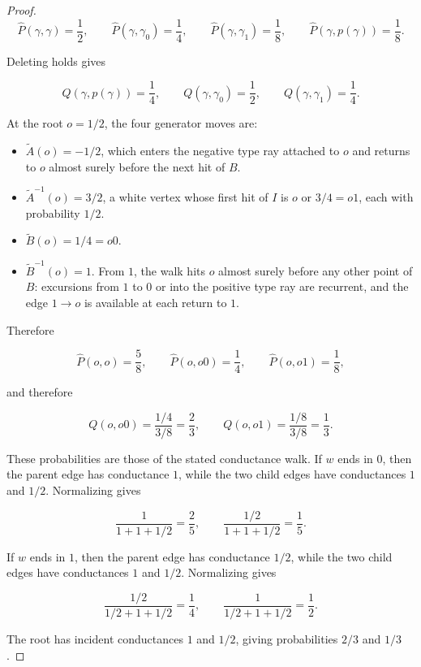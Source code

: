 \documentclass[11pt,a4paper]{scrartcl}
\begin{document}
\begin{proof}
\[
\widehat P(\gamma,\gamma)=\frac12,
\qquad
\widehat P(\gamma,\gamma_0)=\frac14,
\qquad
\widehat P(\gamma,\gamma_1)=\frac18,
\qquad
\widehat P(\gamma,p(\gamma))=\frac18 .
\]

Deleting holds gives

\[
Q(\gamma,p(\gamma))=\frac14,
\qquad
Q(\gamma,\gamma_0)=\frac12,
\qquad
Q(\gamma,\gamma_1)=\frac14 .
\]

At the root \(o=1/2\), the four generator moves are:

\begin{itemize}[leftmargin=*]
\item \(\widetilde A(o)=-1/2\), which enters the negative type ray attached to
  \(o\) and returns to \(o\) almost surely before the next hit of \(B\).
\item \(\widetilde A^{-1}(o)=3/2\), a white vertex whose first hit of \(I\) is
  \(o\) or \(3/4=o1\), each with probability \(1/2\).
\item \(\widetilde B(o)=1/4=o0\).
\item \(\widetilde B^{-1}(o)=1\). From \(1\), the walk hits \(o\) almost surely
  before any other point of \(B\): excursions from \(1\) to \(0\) or into the
  positive type ray are recurrent, and the edge \(1\to o\) is available at
  each return to \(1\).
\end{itemize}

Therefore

\[
\widehat P(o,o)=\frac58,
\qquad
\widehat P(o,o0)=\frac14,
\qquad
\widehat P(o,o1)=\frac18,
\]

and therefore

\[
Q(o,o0)=\frac{1/4}{3/8}=\frac23,
\qquad
Q(o,o1)=\frac{1/8}{3/8}=\frac13 .
\]

These probabilities are those of the stated conductance walk. If
\(w\) ends in \(0\), then the parent edge has conductance \(1\), while the two
child edges have conductances \(1\) and \(1/2\). Normalizing gives

\[
\frac{1}{1+1+1/2}=\frac25,
\qquad
\frac{1/2}{1+1+1/2}=\frac15 .
\]

If \(w\) ends in \(1\), then the parent edge has conductance \(1/2\), while
the two child edges have conductances \(1\) and \(1/2\). Normalizing gives

\[
\frac{1/2}{1/2+1+1/2}=\frac14,
\qquad
\frac{1}{1/2+1+1/2}=\frac12 .
\]

The root has incident conductances \(1\) and \(1/2\), giving probabilities
\(2/3\) and \(1/3\).
\end{proof}
\end{document}
